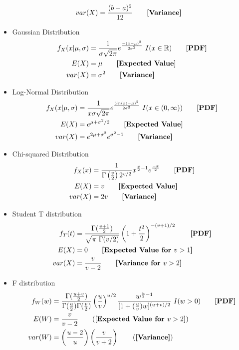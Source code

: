 \documentclass{article}
\begin{document}
\begin{multicols}{2}
\begin{itemize}
\begin{align*}
    var(X) &= \frac{(b-a)^2}{12} \tag*{\textbf{[Variance]}}
  \end{align*}
  \item Gaussian Distribution
  \begin{align*}
    f_X(x|\mu,\sigma) &= \frac{1}{\sigma\sqrt{2\pi}} e^{\frac{-(x-\mu)^2}{2\sigma^2}}~ I(x \in \mathbb{R}) \tag*{\textbf{[PDF]}}\\
    E(X) &= \mu\tag*{\textbf{[Expected Value]}}\\ 
    var(X) &= \sigma^2\tag*{\textbf{[Variance]}}\\ 
  \end{align*}
  \item Log-Normal Distribution
  \begin{align*}
    f_X(x|\mu, \sigma) &= \frac{1}{x \sigma \sqrt{2 \pi}} e^{\frac{(ln(x)-\mu)^2}{2 \sigma^2}}~ I(x \in (0,\infty)) \tag*{\textbf{[PDF]}}\\
	  E(X) &= e^{\mu + \sigma^2/2} \tag*{\textbf{[Expected Value]}}\\
  	var(X) &= e^{2\mu + \sigma^2}e^{\sigma^2-1} \tag*{\textbf{[Variance]}}\\
  \end{align*}
  \item Chi-squared Distribution
  \begin{align*}
    f_X(x) &= \frac{1}{\Gamma\left(\frac{v}{2}\right)2^{v/2}} x^{\frac{v}{2}-1} e^{\frac{-x}{2}} \tag*{\textbf{[PDF]}}\\
    E(X) &= v \tag*{\textbf{[Expected Value]}}\\
    var(X) &= 2v \tag*{\textbf{[Variance]}}\\
  \end{align*}
  \item Student T distribution
  \begin{align*}
      f_T(t) &= \frac{\Gamma(\frac{v+1}{2})}{\sqrt{\pi~\Gamma(v/2)}} \left(1+\frac{t^2}{2}\right)^{-(v+1)/2}\tag*{\textbf{[PDF]}}\\
      E(X) &= 0 \tag*{\textbf{[Expected Value for $v>1$]}}\\
      var(X) &= \frac{v}{v-2} \tag*{\textbf{[Variance for $v>2$]}}\\
  \end{align*}
  \item F distribution
  \begin{align*}
    f_W(w)&=\frac{\Gamma(\frac{u+v}{2})}{\Gamma(\frac{u}{2})\Gamma(\frac{v}{2})}
\left(\frac{u}{v}\right)^{u/2}\frac{w^{\frac{u}{2}-1}}{[1+(\frac{u}{v})w]^{(u+v)/2}}~I(w>0) \tag*{\textbf{[PDF]}}\\
    E(W)&=\frac{v}{v-2} \tag{\textbf{[Expected Value for $v>2$]}}\\
    var(W)&=\left(\frac{u-2}{u}\right) \left(\frac{v}{v+2}\right) \tag{\textbf{[Variance]}}\\
  \end{align*}
  \end{itemize}
  \end{multicols}
\newpage
\end{document}
